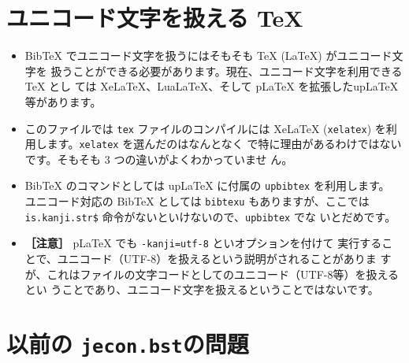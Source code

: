 \documentclass[a4paper,10pt]{bxjsarticle}
\begin{document}
\section{ユニコード文字を扱える \TeX}

\begin{itemize}
 \item BibTeX でユニコード文字を扱うにはそもそも TeX (LaTeX) がユニコード文字を
       扱うことができる必要があります。現在、ユニコード文字を利用できる TeX とし
       ては XeLaTeX、LuaLaTeX、そして pLaTeX を拡張したupLaTeX 等があります。
 \item このファイルでは \texttt{tex} ファイルのコンパイルには XeLaTeX
       (\texttt{xelatex}) を利用します。\texttt{xelatex} を選んだのはなんとなく
       で特に理由があるわけではないです。そもそも 3 つの違いがよくわかっていませ
       ん。
 \item BibTeX のコマンドとしては upLaTeX に付属の \texttt{upbibtex} を利用します。
       ユニコード対応の BibTeX としては \texttt{bibtexu} もありますが、ここでは
       \texttt{is.kanji.str\$} 命令がないといけないので、\texttt{upbibtex} でな
       いとだめです。
 \item \textbf{［注意］} pLaTeX でも \verb|-kanji=utf-8| といオプションを付けて
       実行することで、ユニコード（UTF-8）を扱えるという説明がされることがありま
       すが、これはファイルの文字コードとしてのユニコード（UTF-8等）を扱えるとい
       うことであり、ユニコード文字を扱えるということではないです。
\end{itemize}

\section{以前の \texttt{jecon.bst}の問題}
\label{jecon-problem}
\end{document}
